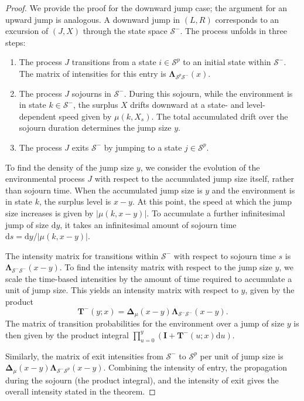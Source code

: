 \documentclass[10pt,a4paper]{amsart}
\newcommand{\dd}{\mathrm{d}}
\begin{document}
\begin{proof}
We provide the proof for the downward jump case; the argument for an upward jump is analogous. A downward jump in \((L,R)\) corresponds to an excursion of \((J,X)\) through the state space \(\mathcal{S}^-\). The process unfolds in three steps:
\begin{enumerate}
    \item The process \(J\) transitions from a state \(i \in \mathcal{S}^p\) to an initial state within \(\mathcal{S}^-\). The matrix of intensities for this entry is \(\bm{\Lambda}_{\mathcal{S}^p\mathcal{S}^-}(x)\).
    \item The process \(J\) sojourns in \(\mathcal{S}^-\). During this sojourn, while the environment is in state \(k \in \mathcal{S}^-\), the surplus \(X\) drifts downward at a state- and level-dependent speed given by \(\mu(k,X_s)\). The total accumulated drift over the sojourn duration determines the jump size \(y\).
    \item The process \(J\) exits \(\mathcal{S}^-\) by jumping to a state \(j \in \mathcal{S}^p\).
\end{enumerate}
To find the density of the jump size \(y\), we consider the evolution of the environmental process \(J\) with respect to the accumulated jump size itself, rather than sojourn time. When the accumulated jump size is \(y\) and the environment is in state \(k\), the surplus level is \(x-y\). At this point, the speed at which the jump size increases is given by \(|\mu(k,x-y)|\). To accumulate a further infinitesimal jump of size \(\dd y\), it takes an infinitesimal amount of sojourn time \(\dd s = \dd y / |\mu(k,x-y)|\).

The intensity matrix for transitions within \(\mathcal{S}^-\) with respect to sojourn time \(s\) is \(\bm{\Lambda}_{\mathcal{S}^-\mathcal{S}^-}(x-y)\). To find the intensity matrix with respect to the jump size \(y\), we scale the time-based intensities by the amount of time required to accumulate a unit of jump size. This yields an intensity matrix with respect to \(y\), given by the product
\[
\bm{T}^-(y;x) = \bm{\Delta}_\mu(x-y) \bm{\Lambda}_{\mathcal{S}^-\mathcal{S}^-}(x-y).
\]
The matrix of transition probabilities for the environment over a jump of size \(y\) is then given by the product integral \(\prod_{u=0}^y (\bm{I} + \bm{T}^-(u;x)\dd u)\).

Similarly, the matrix of exit intensities from \(\mathcal{S}^-\) to \(\mathcal{S}^p\) per unit of jump size is \(\bm{\Delta}_\mu(x-y)\bm{\Lambda}_{\mathcal{S}^-\mathcal{S}^p}(x-y)\). Combining the intensity of entry, the propagation during the sojourn (the product integral), and the intensity of exit gives the overall intensity stated in the theorem.
\end{proof}
\end{document}
